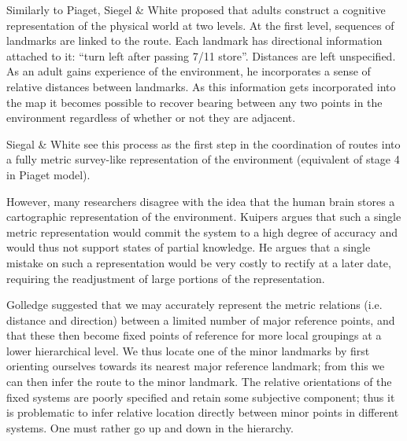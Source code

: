 Similarly to Piaget, Siegel \& White \cite{psycho_siegel75} proposed
that adults construct a cognitive representation of the physical world
at two levels. At the first level, sequences of landmarks are linked
to the route. Each landmark has directional information attached to
it: ``turn left after passing 7/11 store''. Distances are left
unspecified. As an adult gains experience of the environment, he
incorporates a sense of relative distances between landmarks. As this
information gets incorporated into the map it becomes possible to
recover bearing between any two points in the environment regardless
of whether or not they are adjacent.

Siegal \& White \cite{psycho_siegel75} see this process as the first
step in the coordination of routes into a fully metric survey-like
representation of the environment (equivalent of stage 4 in Piaget model).

However, many researchers disagree with the idea that the human brain
stores a cartographic representation of the environment. Kuipers
\cite{psycho_kuipers82} argues that such a single metric
representation would commit the system to a high degree of accuracy
and would thus not support states of partial knowledge. He argues that
a single mistake on such a representation would be very costly to
rectify at a later date, requiring the readjustment of large portions
of the representation.

Golledge \cite{psycho_golledge87} suggested that we may accurately
represent the metric relations (i.e. distance and direction) between a
limited number of major reference points, and that these then become
fixed points of reference for more local groupings at a lower
hierarchical level. We thus locate one of the minor landmarks by first
orienting ourselves towards its nearest major reference landmark; from
this we can then infer the route to the minor landmark. The relative
orientations of the fixed systems are poorly specified and retain some
subjective component; thus it is problematic to infer relative
location directly between minor points in different systems. One must
rather go up and down in the hierarchy.


